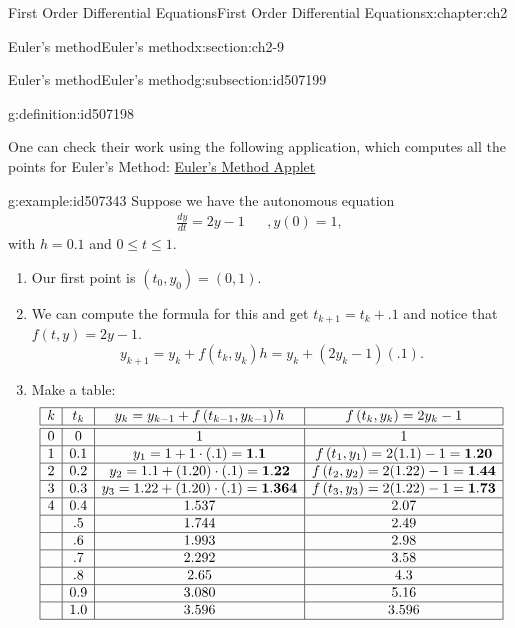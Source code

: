 \documentclass[oneside,10pt,]{book}
\numberwithin{equation}{section}
\numberwithin{equation}{section}
\newcommand{\amp}{&}
\begin{document}
\begin{chapterptx}{First Order Differential Equations}{}{First Order Differential Equations}{}{}{x:chapter:ch2}
\begin{sectionptx}{Euler's method}{}{Euler's method}{}{}{x:section:ch2-9}
\begin{subsectionptx}{Euler's method}{}{Euler's method}{}{}{g:subsection:id507199}
\begin{definition}{}{g:definition:id507198}
%
\end{definition}
 One can check their work using the following application, which computes all the points for Euler's Method: \href{https://davidmathlogic.com/euler/}{Euler's Method Applet}\begin{example}{}{g:example:id507343}%
Suppose we have the autonomous equation%
\begin{align*}
\frac{dy}{dt}=2y-1 \amp  \amp ,y(0)=1,
\end{align*}
with \(h=0.1\) and \(0\leq t\leq1\).%
%
\begin{enumerate}
\item{}Our first point is \((t_{0},y_{0})=\left(0,1\right)\).%
\item{}We can compute the formula for this and get \(t_{k+1}=t_{k}+.1\) and notice that \(f\left(t,y\right)=2y-1\).%
\begin{equation*}
y_{k+1}=y_{k}+f\left(t_{k},y_{k}\right)h=y_{k}+\left(2y_{k}-1\right)(.1).
\end{equation*}
%
\item{}Make a table:%
\begin{equation*}
\begin{array}{|c|c|c|c|}
\hline
k \amp t_{k} \amp y_{k}=y_{k-1}+f\left(t_{k-1},y_{k-1}\right)h \amp f\left(t_{k},y_{k}\right)=2y_{k}-1\\
\hline
\hline
0 \amp 0 \amp 1 \amp 1\\
\hline
1 \amp 0.1 \amp y_{1}=1+1\cdot(.1)=\mathbf{1.1} \amp f\left(t_{1},y_{1}\right)=2(1.1)-1=\mathbf{1.20}\\
\hline
2 \amp 0.2 \amp y_{2}=1.1+(1.20)\cdot(.1)=\mathbf{1.22} \amp f\left(t_{2},y_{2}\right)=2(1.22)-1=\mathbf{1.44}\\
\hline
3 \amp 0.3 \amp y_{3}=1.22+(1.20)\cdot(.1)=\mathbf{1.364} \amp f\left(t_{3},y_{3}\right)=2(1.22)-1=\mathbf{1.73}\\
\hline
4 \amp 0.4 \amp 1.537 \amp 2.07\\
\hline
\amp .5 \amp 1.744 \amp 2.49\\
\hline
\amp .6 \amp 1.993 \amp 2.98\\
\hline
\amp .7 \amp 2.292 \amp 3.58\\
\hline
\amp .8 \amp 2.65 \amp 4.3\\
\hline
\amp 0.9 \amp 3.080 \amp 5.16\\
\hline
\amp 1.0 \amp 3.596 \amp 3.596\\
\hline
\end{array}
\end{equation*}

\end{enumerate}
\end{example}
\end{subsectionptx}
\end{sectionptx}
\end{chapterptx}
\end{document}
